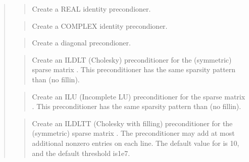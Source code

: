 \documentclass[a4paper,11pt,english]{sphinxmanual}
\begin{document}
\begin{quote}

\begin{quote}

Create a REAL identity precondioner.
\end{quote}

\begin{quote}

Create a COMPLEX identity precondioner.
\end{quote}

\begin{quote}

Create a diagonal precondioner.
\end{quote}

\begin{quote}

Create an ILDLT (Cholesky) preconditioner for the (symmetric) sparse
matrix . This preconditioner has the same sparsity pattern than 
(no fill\sphinxhyphen{}in).
\end{quote}

\begin{quote}

Create an ILU (Incomplete LU) preconditioner for the sparse
matrix . This preconditioner has the same sparsity pattern
than  (no fill\sphinxhyphen{}in).
\end{quote}

\begin{quote}

Create an ILDLTT (Cholesky with filling) preconditioner for the
(symmetric) sparse matrix . The preconditioner may add at most
 additional non\sphinxhyphen{}zero entries on each line. The default value
for  is 10, and the default threshold is1e\sphinxhyphen{}7.
\end{quote}


\end{quote}
\end{document}
